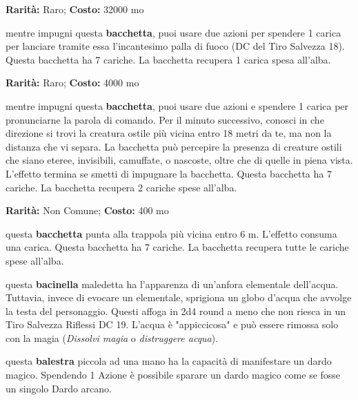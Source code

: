 \begin{multicols}{2}




\textbf{Rarità:} Raro; \textbf{Costo:} 32000 mo

mentre impugni questa \textbf{bacchetta}, puoi usare due azioni per spendere 1 carica per lanciare tramite essa l'incantesimo palla di fuoco (DC del Tiro Salvezza 18). Questa bacchetta ha 7 cariche. La bacchetta recupera 1 carica spesa all'alba.


\textbf{Rarità:} Raro; \textbf{Costo:} 4000 mo

mentre impugni questa \textbf{bacchetta}, puoi usare due azioni e spendere 1 carica per pronunciarne la parola di comando. Per il minuto successivo, conosci in che direzione si trovi la creatura ostile più vicina entro 18 metri da te, ma non la distanza che vi separa. La bacchetta può percepire la presenza di creature ostili che siano eteree, invisibili, camuffate, o nascoste, oltre che di quelle in piena vista. L'effetto termina se smetti di impugnare la bacchetta. Questa bacchetta ha 7 cariche. La bacchetta recupera 2 cariche spese all'alba.


\textbf{Rarità:} Non Comune; \textbf{Costo:} 400 mo

questa \textbf{bacchetta} punta alla trappola più vicina entro 6 m. L'effetto consuma una carica. Questa bacchetta ha 7 cariche. La bacchetta recupera tutte le cariche spese all'alba.


questa \textbf{bacinella} maledetta ha l'apparenza di un'anfora elementale dell'acqua. Tuttavia, invece di evocare un elementale, sprigiona un globo d'acqua che avvolge la testa del personaggio. Questi affoga in 2d4 round a meno che non riesca in un Tiro Salvezza Riflessi DC 19. L'acqua è "appiccicosa" e può essere rimossa solo con la magia (\emph{Dissolvi magia} o \emph{distruggere acqua}).


questa \textbf{balestra} piccola ad una mano ha la capacità di manifestare un dardo magico.
Spendendo 1 Azione è possibile sparare un dardo magico come se fosse un singolo Dardo arcano.


\end{multicols}
